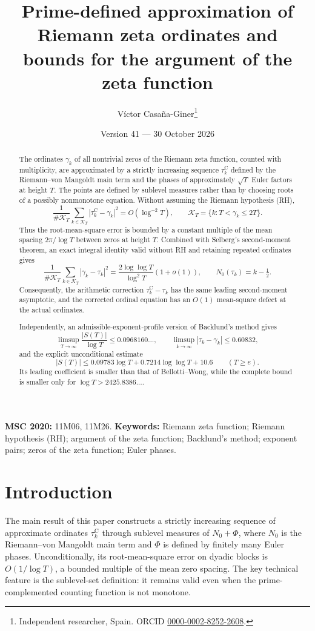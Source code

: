 \documentclass[11pt,a4paper]{article}
\title{Prime-defined approximation of Riemann zeta ordinates and bounds for the argument of the zeta function}
\author{V\'ictor Casa\~na-Giner\thanks{Independent researcher, Spain. ORCID \href{https://orcid.org/0000-0002-8252-2608}{0000-0002-8252-2608}.}}
\date{Version 41 --- 30 October 2026}
\numberwithin{equation}{section}
\theoremstyle{definition}
\theoremstyle{remark}
\newcommand{\Nz}{N_0} %
\newcommand{\Ph}{\Phi}
\begin{document}
\maketitle

\begin{abstract}
The ordinates $\gamma_k$ of all nontrivial zeros of the Riemann zeta function, counted with multiplicity, are approximated by a strictly increasing sequence $\tau_k^{\mathrm C}$ defined by the Riemann--von Mangoldt main term and the phases of approximately $\sqrt T$ Euler factors at height $T$. The points are defined by sublevel measures rather than by choosing roots of a possibly nonmonotone equation. Without assuming the Riemann hypothesis (RH),
\[
\frac{1}{\#\mathcal K_T}\sum_{k\in\mathcal K_T}
|\tau_k^{\mathrm C}-\gamma_k|^2=O(\log^{-2}T),
\qquad \mathcal K_T=\{k:T<\gamma_k\le2T\}.
\]
Thus the root-mean-square error is bounded by a constant multiple of the mean spacing $2\pi/\log T$ between zeros at height $T$. Combined with Selberg's second-moment theorem, an exact integral identity valid without RH and retaining repeated ordinates gives
\[
\frac1{\#\mathcal K_T}\sum_{k\in\mathcal K_T}
|\gamma_k-\tau_k|^2
=\frac{2\log\log T}{\log^2T}(1+o(1)),
\qquad N_0(\tau_k)=k-\tfrac12.
\]
Consequently, the arithmetic correction $\tau_k^{\mathrm C}-\tau_k$ has the same leading second-moment asymptotic, and the corrected ordinal equation has an $O(1)$ mean-square defect at the actual ordinates.

Independently, an admissible-exponent-profile version of Backlund's method gives
\[
\limsup_{T\to\infty}\frac{|S(T)|}{\log T}\le0.0968160\ldots,
\qquad
\limsup_{k\to\infty}|\tau_k-\gamma_k|\le0.60832,
\]
and the explicit unconditional estimate
\[
|S(T)|\le0.09783\log T+0.7214\log\log T+10.6
\qquad (T\ge e).
\]
Its leading coefficient is smaller than that of Bellotti--Wong, while the complete bound is smaller only for $\log T>2425.8386\ldots$.
\end{abstract}

\medskip
\noindent\textbf{MSC 2020:} 11M06, 11M26. \quad \textbf{Keywords:} Riemann zeta function; Riemann hypothesis (RH); argument of the zeta function; Backlund's method; exponent pairs; zeros of the zeta function; Euler phases.

\tableofcontents

\section{Introduction}\label{sec:intro}
The main result of this paper constructs a strictly increasing sequence of approximate ordinates $\tau_k^{\mathrm C}$ through sublevel measures of $\Nz+\Ph$, where $\Nz$ is the Riemann--von Mangoldt main term and $\Ph$ is defined by finitely many Euler phases. Unconditionally, its root-mean-square error on dyadic blocks is $O(1/\log T)$, a bounded multiple of the mean zero spacing. The key technical feature is the sublevel-set definition: it remains valid even when the prime-complemented counting function is not monotone.
\end{document}
